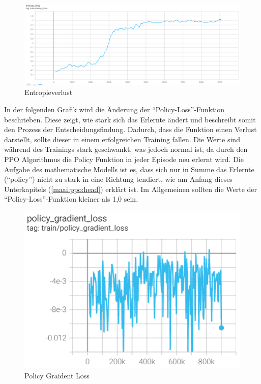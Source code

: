 \begin{figure}[H]
  \centering
  \includegraphics[scale=0.6]{pics/Tensorboard/PPO/entropy_loss.png}
  \caption{Entropieverlust}
  \label{fig:ppo:entropyloss}
\end{figure}

In der folgenden Grafik wird die Änderung der ``Policy-Loss''-Funktion beschrieben.
Diese zeigt, wie stark sich das Erlernte ändert und beschreibt somit den Prozess der Entscheidungsfindung.
Dadurch, dass die Funktion einen Verlust darstellt, sollte dieser in einem erfolgreichen Training fallen.
Die Werte sind während des Trainings stark geschwankt, was jedoch normal ist,
da durch den PPO Algorithmus die Policy Funktion in jeder Episode neu erlernt wird.
Die Aufgabe des mathematische Modells ist es, dass sich nur in Summe das Erlernte (``policy'') nicht zu stark in eine Richtung tendiert, wie am Anfang dieses Unterkapitels (\ref{maai:ppo:head}) erklärt ist.
Im Allgemeinen sollten die Werte der ``Policy-Loss''-Funktion kleiner als 1,0 sein.

\begin{figure}[H]
  \centering
  \includegraphics[scale=0.7]{pics/Tensorboard/PPO/policy_loss_new.png}
  \caption{Policy Graident Loss}
  \label{fig:ppo:pgl}
\end{figure}

